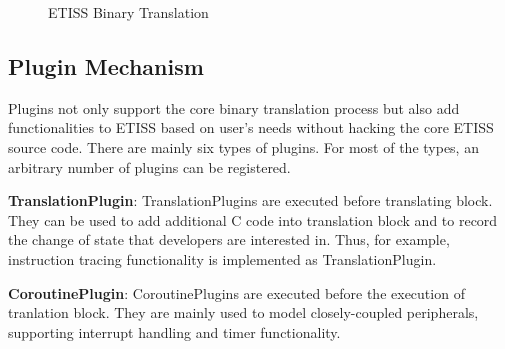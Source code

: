 
\begin{figure}[ht]
    \caption{ETISS Binary Translation\cite{ETISS}}
    \label{fig:etiss_binary_translation}
\end{figure}

\subsection{Plugin Mechanism}
Plugins not only support the core binary translation process but also add functionalities to ETISS based on user's needs without hacking the core ETISS source code.
There are mainly six types of plugins. For most of the types, an arbitrary number of plugins can be registered.

\medskip
\textbf{TranslationPlugin}: TranslationPlugins are executed before translating block. They can be used to add additional C code into translation block and to record the change of state that developers are interested in. Thus, for example, instruction tracing functionality is implemented as TranslationPlugin.

\textbf{CoroutinePlugin}: CoroutinePlugins are executed before the execution of tranlation block. They are mainly used to model closely-coupled peripherals, supporting
interrupt handling and timer functionality.

